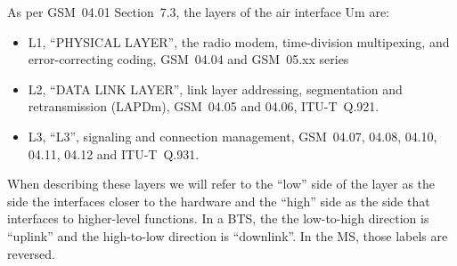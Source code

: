 \documentclass[11pt]{book}
\begin{document}
As per GSM~04.01 Section~7.3, the layers of the air interface Um are:
\begin{itemize}
	\item L1, ``PHYSICAL LAYER'', the radio modem, time-division multipexing, and error-correcting coding, GSM~04.04 and GSM~05.xx series
	\item L2, ``DATA LINK LAYER'', link layer addressing, segmentation and retransmission (LAPDm), GSM~04.05 and 04.06, ITU-T~Q.921.
	\item L3, ``L3'', signaling and connection management, GSM~04.07, 04.08, 04.10, 04.11, 04.12 and ITU-T~Q.931.
\end{itemize}

When describing these layers we will refer to the ``low'' side of the layer as the side the interfaces closer to the hardware and the ``high'' side as the side that interfaces to higher-level functions.  In a BTS, the the low-to-high direction is ``uplink'' and the high-to-low direction is ``downlink''.  In the MS, those labels are reversed.
\end{document}
